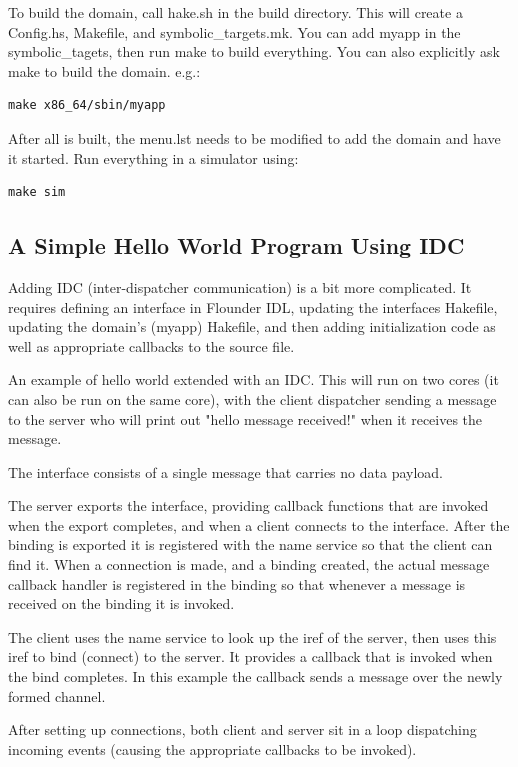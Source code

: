 \documentclass[a4paper,twoside]{report} %
\begin{document}
To build the domain, call hake.sh in the build directory. This will create a
Config.hs, Makefile, and symbolic\_targets.mk. You can add myapp in the
symbolic\_tagets, then run make to build everything. You can also explicitly ask
make to build the domain. e.g.:
\begin{verbatim}
make x86_64/sbin/myapp
\end{verbatim}

After all is built, the menu.lst needs to be modified to add the domain and have
it started. Run everything in a simulator using:

\begin{verbatim}
make sim
\end{verbatim}

\subsection{A Simple Hello World Program Using IDC}

Adding IDC (inter-dispatcher communication) is a bit more complicated. It
requires defining an interface in Flounder IDL, updating the interfaces
Hakefile, updating the domain's (myapp) Hakefile, and then adding initialization
code as well as appropriate callbacks to the source file.

An example of hello world extended with an IDC. This will run on two cores (it
can also be run on the same core), with the client dispatcher sending a message
to the server who will print out "hello message received!" when it receives the
message.


The interface consists of a single message that carries no data payload.

The server exports the interface, providing callback functions that are invoked
when the export completes, and when a client connects to the interface. After
the binding is exported it is registered with the name service so that the
client can find it. When a connection is made, and a binding created, the actual
message callback handler is registered in the binding so that whenever a message
is received on the binding it is invoked.

The client uses the name service to look up the iref of the server, then uses
this iref to bind (connect) to the server. It provides a callback that is
invoked when the bind completes. In this example the callback sends a message
over the newly formed channel.

After setting up connections, both client and server sit in a loop dispatching
incoming events (causing the appropriate callbacks to be invoked).
\end{document}
